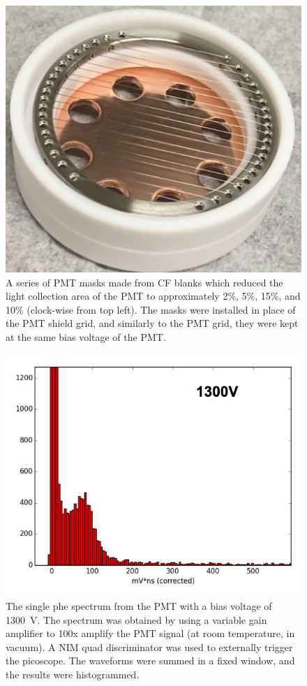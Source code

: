 \begin{figure}[htbp]
\begin{center}
\includegraphics[width=\halffig]{figures/etrains/mask4.png}
\caption{A series of \acs{PMT} masks made from \acs{CF} blanks which reduced the light collection area of the \acs{PMT} to approximately 2\%, 5\%, 15\%, and 10\% (clock-wise from top left). The masks were installed in place of the \acs{PMT} shield grid, and similarly to the \acs{PMT} grid, they were kept at the same bias voltage of the \acs{PMT}. }
\label{fig:pmt_masks}
\end{center}
\end{figure}

\begin{figure}[htbp]
\begin{center}
\includegraphics[width=\halffig]{figures/etrains/1300V_singlephe.png}
\caption{The single phe spectrum from the \acs{PMT} with a bias voltage of 1300~V. The spectrum was obtained by using a variable gain amplifier to 100x amplify the \acs{PMT} signal (at room temperature, in vacuum). A \acs{NIM} quad discriminator was used to externally trigger the picoscope. The waveforms were summed in a fixed window, and the results were histogrammed.}
\label{fig:single_phe}
\end{center}
\end{figure}

